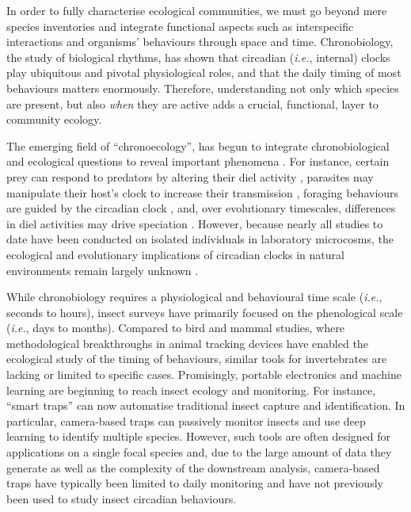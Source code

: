 \documentclass[12pt]{article}
\begin{document}
\begin{linenumbers}
		In order to fully characterise ecological communities, we must go beyond mere species inventories and integrate functional aspects such as interspecific interactions and organisms’ behaviours through space and time\cite{bro-jorgensen_linking_2019, cordero-rivera_behavioral_2017}. %
		Chronobiology, the study of biological rhythms, has shown that circadian (\emph{i.e.}, internal) clocks play ubiquitous and pivotal physiological roles, and that the daily timing of most behaviours matters enormously\cite{patke_molecular_2020}. Therefore, understanding not only which species are present, but also \emph{when} they are active adds a crucial, functional, layer to community ecology.

		The emerging field of “chronoecology”, has begun to integrate chronobiological and ecological questions to reveal important phenomena \cite{halle_chronoecology_2000,helm_two_2017}. For instance, certain prey can respond to predators by altering their diel activity \cite{van_der_veen_flexible_2017}, parasites may manipulate their host’s clock to increase their transmission \cite{westwood_evolutionary_2019}, foraging behaviours are guided by the circadian clock \cite{jain_time-restricted_2018}, and, over evolutionary timescales, differences in diel activities may drive speciation \cite{taylor_role_2017}. However, because nearly all studies to date have been conducted on isolated individuals in laboratory microcosms, the ecological and evolutionary implications of circadian clocks in natural environments remain largely unknown \cite{schwartz_wild_2017}.

		While chronobiology requires a physiological and behavioural time scale (\emph{i.e.}, seconds to hours), insect surveys have primarily focused on the phenological scale (\emph{i.e.}, days to months). Compared to bird and mammal studies, where methodological breakthroughs in animal tracking devices have enabled the ecological study of the timing of behaviours, similar tools for invertebrates are lacking\cite{dominoni_methods_2017} or limited to specific cases\cite{brydegaard_daily_2016,goldshtein_long-term_2021,nunes-silva_applications_2019}. Promisingly, portable electronics and machine learning are beginning to reach insect ecology and monitoring\cite{hoye_deep_2021}. For instance, “smart traps” can now automatise traditional insect capture and identification\cite{cardim_ferreira_lima_automatic_2020}. In particular, camera-based traps can passively monitor insects and use deep learning to identify multiple species. However, such tools are often designed for applications on a single focal species and, due to the large amount of data they generate as well as the complexity of the downstream analysis, camera-based traps have typically been limited to daily monitoring and have not previously been used to study insect circadian behaviours.


\end{linenumbers}
\end{document}
